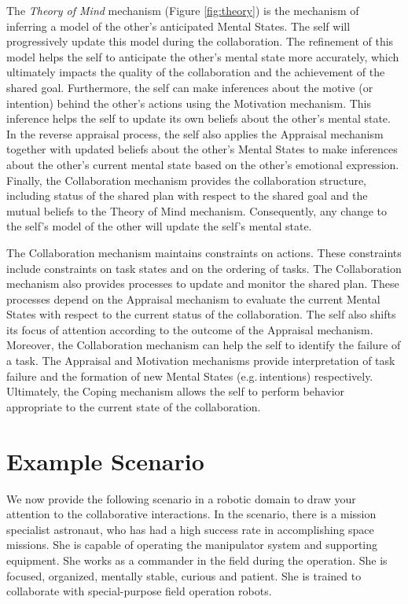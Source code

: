 \documentclass[12pt]{report}
\begin{document}
The \textit{Theory of Mind} mechanism (Figure \ref{fig:theory}) is the mechanism of
inferring a model of the other's anticipated Mental States. The self will
progressively update this model during the collaboration. The refinement of this
model helps the self to anticipate the other's mental state more accurately,
which ultimately impacts the quality of the collaboration and the achievement of
the shared goal. Furthermore, the self can make inferences about the motive (or
intention) behind the other's actions using the Motivation mechanism. This
inference helps the self to update its own beliefs about the other's mental
state. In the reverse appraisal process, the self also applies the Appraisal
mechanism together with updated beliefs about the other's Mental States to make
inferences about the other's current mental state based on the other's emotional
expression. Finally, the Collaboration mechanism provides the collaboration
structure, including status of the shared plan with respect to the shared goal
and the mutual beliefs to the Theory of Mind mechanism. Consequently, any change
to the self's model of the other will update the self's mental state.

The Collaboration mechanism maintains constraints on actions. These constraints
include constraints on task states and on the ordering of tasks. The
Collaboration mechanism also provides processes to update and monitor the shared
plan. These processes depend on the Appraisal mechanism to evaluate the current
Mental States with respect to the current status of the collaboration. The self
also shifts its focus of attention according to the outcome of the Appraisal
mechanism. Moreover, the Collaboration mechanism can help the self to identify the
failure of a task. The Appraisal and Motivation mechanisms provide interpretation
of task failure and the formation of new Mental States (e.g.\,intentions)
respectively. Ultimately, the Coping mechanism allows the self to perform behavior
appropriate to the current state of the collaboration.

\section{Example Scenario}
\label{sec:example-scenario}
We now provide the following scenario in a robotic domain to draw your attention
to the collaborative interactions. In the scenario, there is a mission
specialist astronaut, who has had a high success rate in accomplishing space
missions. She is capable of operating the manipulator system and supporting
equipment. She works as a commander in the field during the operation. She is
focused, organized, mentally stable, curious and patient. She is trained to
collaborate with special-purpose field operation robots.
\end{document}
